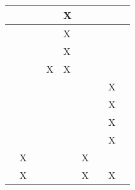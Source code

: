 \begin{longtable}{|l|llllllll|}
    \cite[]{Furrer.2016}          & \multicolumn{1}{l|}{}   & \multicolumn{1}{l|}{}    & \multicolumn{1}{l|}{}   & \multicolumn{1}{l|}{X}   & \multicolumn{1}{l|}{}   & \multicolumn{1}{l|}{}   & \multicolumn{1}{l|}{}     &    \\ \hline
    \cite[]{Silano.2020}          & \multicolumn{1}{l|}{}   & \multicolumn{1}{l|}{}    & \multicolumn{1}{l|}{}   & \multicolumn{1}{l|}{X}   & \multicolumn{1}{l|}{}   & \multicolumn{1}{l|}{}   & \multicolumn{1}{l|}{}     &    \\ \hline
    \cite[]{Shah.2017}            & \multicolumn{1}{l|}{}   & \multicolumn{1}{l|}{}    & \multicolumn{1}{l|}{}   & \multicolumn{1}{l|}{X}   & \multicolumn{1}{l|}{}   & \multicolumn{1}{l|}{}   & \multicolumn{1}{l|}{}     &    \\ \hline
    \cite[]{Panerati.332021}      & \multicolumn{1}{l|}{}   & \multicolumn{1}{l|}{}    & \multicolumn{1}{l|}{X}   & \multicolumn{1}{l|}{X}   & \multicolumn{1}{l|}{}   & \multicolumn{1}{l|}{}   & \multicolumn{1}{l|}{}     &    \\ \hline
    \cite[]{Moos.2022}            & \multicolumn{1}{l|}{}   & \multicolumn{1}{l|}{}    & \multicolumn{1}{l|}{}   & \multicolumn{1}{l|}{}   & \multicolumn{1}{l|}{}   & \multicolumn{1}{l|}{}   & \multicolumn{1}{l|}{X}     &    \\ \hline
    \cite[]{Pullum.2022}          & \multicolumn{1}{l|}{}   & \multicolumn{1}{l|}{}    & \multicolumn{1}{l|}{}   & \multicolumn{1}{l|}{}   & \multicolumn{1}{l|}{}   & \multicolumn{1}{l|}{}   & \multicolumn{1}{l|}{X}     &    \\ \hline
    \cite[]{Liu.2023}             & \multicolumn{1}{l|}{}   & \multicolumn{1}{l|}{}    & \multicolumn{1}{l|}{}   & \multicolumn{1}{l|}{}   & \multicolumn{1}{l|}{}   & \multicolumn{1}{l|}{}   & \multicolumn{1}{l|}{X}     &    \\ \hline
    \cite[]{YanDuan.2016}         & \multicolumn{1}{l|}{}   & \multicolumn{1}{l|}{}    & \multicolumn{1}{l|}{}   & \multicolumn{1}{l|}{}   & \multicolumn{1}{l|}{}   & \multicolumn{1}{l|}{}   & \multicolumn{1}{l|}{X}     &    \\ \hline
    \cite[]{Schott.2022}          & \multicolumn{1}{l|}{X}   & \multicolumn{1}{l|}{}    & \multicolumn{1}{l|}{}   & \multicolumn{1}{l|}{}   & \multicolumn{1}{l|}{X}   & \multicolumn{1}{l|}{}   & \multicolumn{1}{l|}{}     &    \\ \hline
    \cite[]{Pinto.2017}           & \multicolumn{1}{l|}{X}   & \multicolumn{1}{l|}{}    & \multicolumn{1}{l|}{}   & \multicolumn{1}{l|}{}   & \multicolumn{1}{l|}{X}   & \multicolumn{1}{l|}{}   & \multicolumn{1}{l|}{X}     &    \\ \hline

\end{longtable}
